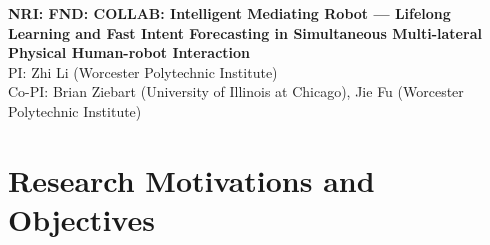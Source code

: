 \documentclass[letterpaper, 11 pt, onecolumn]{article}
\begin{document}
\setcounter{page}{1}

\pagebreak


\begin{center}
	{\large \bf NRI: FND: COLLAB: Intelligent Mediating Robot --- Lifelong Learning and Fast Intent Forecasting in Simultaneous Multi-lateral Physical Human-robot Interaction}\\
    \vspace{4pt}
   	PI: Zhi Li (Worcester Polytechnic Institute)\\
    Co-PI: Brian Ziebart (University of Illinois at Chicago), Jie Fu (Worcester Polytechnic Institute)
\end{center}

\vspace{-4pt}




\pagestyle{plain}
\setcounter{page}{1}




\section{Research Motivations and Objectives}\label{sec:intro}
\end{document}
